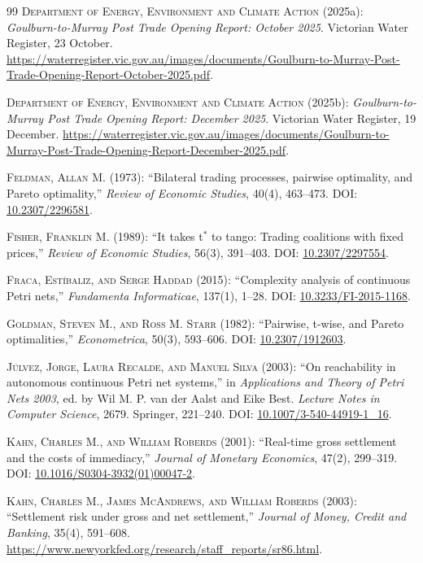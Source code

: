 \documentclass[ecta,draft]{econsocart}
\theoremstyle{definition}
\theoremstyle{definition}
\begin{document}
\begin{thebibliography}{99}
\textsc{Department of Energy, Environment and Climate Action} (2025a):
\emph{Goulburn-to-Murray Post Trade Opening Report: October 2025}.
Victorian Water Register, 23 October.
\url{https://waterregister.vic.gov.au/images/documents/Goulburn-to-Murray-Post-Trade-Opening-Report-October-2025.pdf}.

\textsc{Department of Energy, Environment and Climate Action} (2025b):
\emph{Goulburn-to-Murray Post Trade Opening Report: December 2025}.
Victorian Water Register, 19 December.
\url{https://waterregister.vic.gov.au/images/documents/Goulburn-to-Murray-Post-Trade-Opening-Report-December-2025.pdf}.

\textsc{Feldman, Allan M.} (1973): ``Bilateral trading processes, pairwise optimality, and Pareto optimality,'' \emph{Review of Economic Studies}, 40(4), 463--473. DOI: \url{10.2307/2296581}.

\textsc{Fisher, Franklin M.} (1989): ``It takes t$^{*}$ to tango: Trading coalitions with fixed prices,'' \emph{Review of Economic Studies}, 56(3), 391--403. DOI: \url{10.2307/2297554}.

\textsc{Fraca, Estíbaliz, and Serge Haddad} (2015): ``Complexity analysis of continuous Petri nets,'' \emph{Fundamenta Informaticae}, 137(1), 1--28. DOI: \url{10.3233/FI-2015-1168}.

\textsc{Goldman, Steven M., and Ross M. Starr} (1982): ``Pairwise, t-wise, and Pareto optimalities,'' \emph{Econometrica}, 50(3), 593--606. DOI: \url{10.2307/1912603}.

\textsc{Júlvez, Jorge, Laura Recalde, and Manuel Silva} (2003): ``On reachability in autonomous continuous Petri net systems,'' in \emph{Applications and Theory of Petri Nets 2003}, ed. by Wil M. P. van der Aalst and Eike Best. \emph{Lecture Notes in Computer Science}, 2679. Springer, 221--240. DOI: \url{10.1007/3-540-44919-1_16}.

\textsc{Kahn, Charles M., and William Roberds} (2001): ``Real-time gross settlement and the costs of immediacy,'' \emph{Journal of Monetary Economics}, 47(2), 299--319. DOI: \url{10.1016/S0304-3932(01)00047-2}.

\textsc{Kahn, Charles M., James McAndrews, and William Roberds} (2003): ``Settlement risk under gross and net settlement,'' \emph{Journal of Money, Credit and Banking}, 35(4), 591--608.
\url{https://www.newyorkfed.org/research/staff_reports/sr86.html}.


\end{thebibliography}
\end{document}
